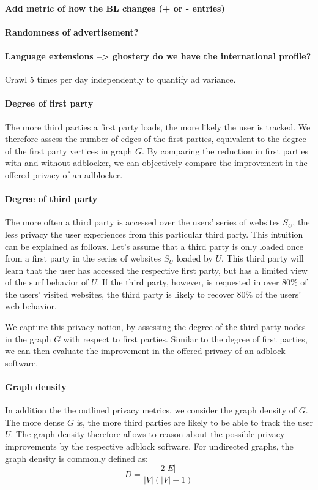 \documentclass{sig-alternate}
\begin{document}
\paragraph{Add metric of how the BL changes (+ or - entries)}
\paragraph{Randomness of advertisement?}
\paragraph{Language extensions --> ghostery do we have the international profile?}

Crawl 5 times per day independently to quantify ad variance.

\paragraph{Degree of first party}
The more third parties a first party loads, the more likely the user is tracked. We therefore assess the number of edges of the first parties, equivalent to the degree of the first party vertices in graph $G$. By comparing the reduction in first parties with and without adblocker, we can objectively compare the improvement in the offered privacy of an adblocker.

\paragraph{Degree of third party}
The more often a third party is accessed over the users' series of websites $S_U$, the less privacy the user experiences from this particular third party. This intuition can be explained as follows. Let's assume that a third party is only loaded once from a first party in the series of websites $S_U$ loaded by $U$. This third party will learn that the user has accessed the respective first party, but has a limited view of the surf behavior of $U$. If the third party, however, is requested in over 80\% of the users' visited websites, the third party is likely to recover 80\% of the users' web behavior.

We capture this privacy notion, by assessing the degree of the third party nodes in the graph $G$ with respect to first parties.
Similar to the degree of first parties, we can then evaluate the improvement in the offered privacy of an adblock software.

\paragraph{Graph density}
In addition the the outlined privacy metrics, we consider the graph density of $G$. The more dense $G$ is, the more third parties are likely to be able to track the user $U$. The graph density therefore allows to reason about the possible privacy improvements by the respective adblock software. For undirected graphs, the graph density is commonly defined as:
\begin{equation}
D = \frac{2 |E|}{|V|(|V|-1)}
\end{equation}
\end{document}
